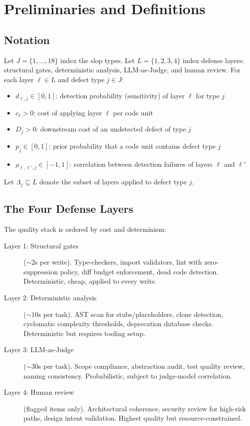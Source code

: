 \documentclass[11pt, a4paper, logo, copyright]{googledeepmind}
\begin{document}
\section{Preliminaries and Definitions}
\label{sec:prelim}

\subsection{Notation}

Let $J = \{1, \ldots, 18\}$ index the slop types. Let $L = \{1, 2, 3, 4\}$ index defense layers: structural gates, deterministic analysis, LLM-as-Judge, and human review. For each layer $\ell \in L$ and defect type $j \in J$:

\begin{itemize}
\item $d_{\ell,j} \in [0,1]$: detection probability (sensitivity) of layer $\ell$ for type $j$
\item $c_\ell > 0$: cost of applying layer $\ell$ per code unit
\item $D_j > 0$: downstream cost of an undetected defect of type $j$
\item $p_j \in [0,1]$: prior probability that a code unit contains defect type $j$
\item $\rho_{\ell,\ell',j} \in [-1,1]$: correlation between detection failures of layers $\ell$ and $\ell'$
\end{itemize}

Let $\Lambda_j \subseteq L$ denote the subset of layers applied to defect type $j$.

\subsection{The Four Defense Layers}

The quality stack is ordered by cost and determinism:

\begin{description}
\item[Layer 1: Structural gates] (${\sim}2$s per write). Type-checkers, import validators, lint with zero-suppression policy, diff budget enforcement, dead code detection. Deterministic, cheap, applied to every write.

\item[Layer 2: Deterministic analysis] (${\sim}10$s per task). AST scan for stubs/placeholders, clone detection, cyclomatic complexity thresholds, deprecation database checks. Deterministic but requires tooling setup.

\item[Layer 3: LLM-as-Judge] (${\sim}30$s per task). Scope compliance, abstraction audit, test quality review, naming consistency. Probabilistic, subject to judge-model correlation.

\item[Layer 4: Human review] (flagged items only). Architectural coherence, security review for high-risk paths, design intent validation. Highest quality but resource-constrained.
\end{description}
\end{document}
